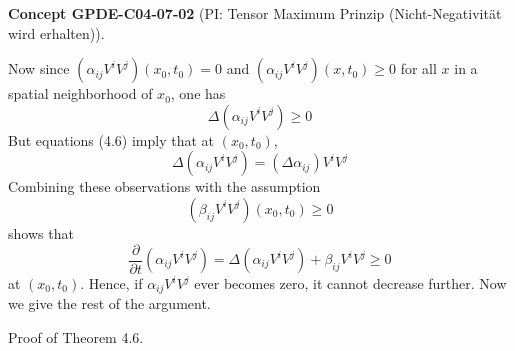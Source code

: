 \documentclass[10pt, letterpaper]{article}
\newcommand{\CustomHeading}[3]{%
  \par\medskip\noindent%
  \textbf{#1 #2} \textnormal{(#3)}.\enskip%
}
\newenvironment{CONC}[2]{\begin{unitbox}\CustomHeading{Concept}{#1}{#2}}{\end{unitbox}}
\begin{document}
\begin{CONC}{GPDE-C04-07-02}{PI: Tensor Maximum Prinzip (Nicht-Negativität wird erhalten)}
$$$$
Now since $\left(\alpha_{i j} V^i V^j\right)\left(x_0, t_0\right)=0$ and $\left(\alpha_{i j} V^i V^j\right)\left(x, t_0\right) \geq 0$ for all $x$ in a spatial neighborhood of $x_0$, one has
$$
\Delta\left(\alpha_{i j} V^i V^j\right) \geq 0
$$
But equations (4.6) imply that at $\left(x_0, t_0\right)$,
$$
\Delta\left(\alpha_{i j} V^i V^j\right)=\left(\Delta \alpha_{i j}\right) V^i V^j
$$
Combining these observations with the assumption
$$
\left(\beta_{i j} V^i V^j\right)\left(x_0, t_0\right) \geq 0
$$
shows that
$$
\frac{\partial}{\partial t}\left(\alpha_{i j} V^i V^j\right)=\Delta\left(\alpha_{i j} V^i V^j\right)+\beta_{i j} V^i V^j \geq 0
$$
at $\left(x_0, t_0\right)$. Hence, if $\alpha_{i j} V^i V^j$ ever becomes zero, it cannot decrease further.
Now we give the rest of the argument.
\end{CONC}


Proof of Theorem 4.6. 
\end{document}
